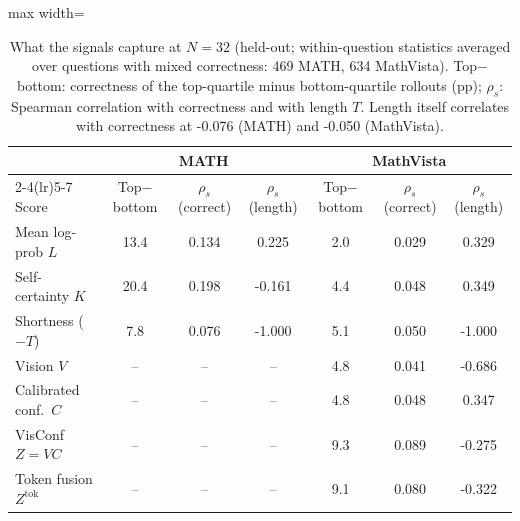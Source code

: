\begin{table}[htbp]
\centering
\small
\caption{What the signals capture at $N{=}32$ (held-out; within-question statistics averaged over questions with mixed correctness: 469 MATH, 634 MathVista). Top$-$bottom: correctness of the top-quartile minus bottom-quartile rollouts (pp); $\rho_s$: Spearman correlation with correctness and with length $T$. Length itself correlates with correctness at -0.076 (MATH) and -0.050 (MathVista).}
\label{tab:t3-signals}
\begin{adjustbox}{max width=\linewidth}
\begin{tabular}{lcccccc}
\toprule
 & \multicolumn{3}{c}{MATH} & \multicolumn{3}{c}{MathVista} \\
\cmidrule(lr){2-4}\cmidrule(lr){5-7}
Score & Top$-$bottom & $\rho_s$(correct) & $\rho_s$(length) & Top$-$bottom & $\rho_s$(correct) & $\rho_s$(length) \\
\midrule
Mean log-prob $L$ & 13.4 & 0.134 & 0.225 & 2.0 & 0.029 & 0.329 \\
Self-certainty $K$ & 20.4 & 0.198 & -0.161 & 4.4 & 0.048 & 0.349 \\
Shortness ($-T$) & 7.8 & 0.076 & -1.000 & 5.1 & 0.050 & -1.000 \\
\midrule
Vision $V$ & -- & -- & -- & 4.8 & 0.041 & -0.686 \\
Calibrated conf.\ $C$ & -- & -- & -- & 4.8 & 0.048 & 0.347 \\
VisConf $Z=VC$ & -- & -- & -- & 9.3 & 0.089 & -0.275 \\
Token fusion $Z^\text{tok}$ & -- & -- & -- & 9.1 & 0.080 & -0.322 \\
\bottomrule
\end{tabular}
\end{adjustbox}
\end{table}
